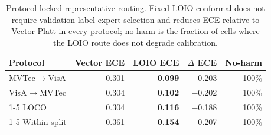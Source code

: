 \begin{table}[pos=t]
\centering
\caption{Protocol-locked representative routing. Fixed LOIO conformal does not require validation-label expert selection and reduces ECE relative to Vector Platt in every protocol; no-harm is the fraction of cells where the LOIO route does not degrade calibration.}
\label{tab:protocol-routing}
\footnotesize
\begin{tabular}{lrrrr}
\toprule
Protocol & Vector ECE & LOIO ECE & $\Delta$ ECE & No-harm \\
\midrule
MVTec$\rightarrow$VisA & 0.301 & \textbf{0.099} & $-$0.203 & 100\% \\
VisA$\rightarrow$MVTec & 0.304 & \textbf{0.102} & $-$0.202 & 100\% \\
\cmidrule(lr){1-5}
LOCO & 0.304 & \textbf{0.116} & $-$0.188 & 100\% \\
\cmidrule(lr){1-5}
Within split & 0.361 & \textbf{0.154} & $-$0.207 & 100\% \\
\bottomrule
\end{tabular}
\end{table}

